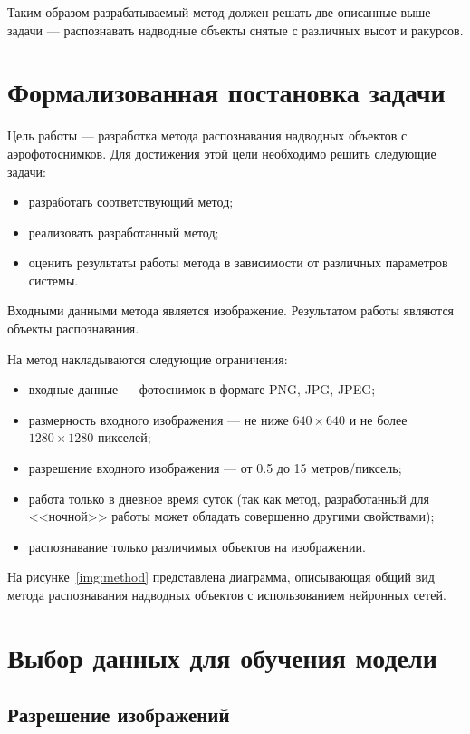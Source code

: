 Таким образом разрабатываемый метод должен решать две описанные выше задачи --- распознавать надводные объекты снятые с различных высот и ракурсов.

\section{Формализованная постановка задачи}

Цель работы --- разработка метода распознавания надводных объектов с аэрофотоснимков. Для достижения этой цели необходимо решить следующие задачи:
\begin{itemize}[label=---]
    \item разработать соответствующий метод;
    \item реализовать разработанный метод;
    \item оценить результаты работы метода в зависимости от различных параметров системы.
\end{itemize}

Входными данными метода является изображение. Результатом работы являются объекты распознавания.

На метод накладываются следующие ограничения:
\begin{itemize}[label=---]
    \item входные данные --- фотоснимок в формате PNG, JPG, JPEG;
    \item размерность входного изображения --- не ниже $640 \times 640$ и не более $1280 \times 1280$ пикселей;
    \item разрешение входного изображения --- от 0.5 до 15 метров/пиксель;
    \item работа только в дневное время суток (так как метод, разработанный для <<ночной>> работы может обладать совершенно другими свойствами);
    \item распознавание только различимых объектов на изображении.
\end{itemize}

На рисунке~\ref{img:method} представлена диаграмма, описывающая общий вид метода распознавания надводных объектов с использованием нейронных сетей.


\section{Выбор данных для обучения модели}

\subsection{Разрешение изображений}

